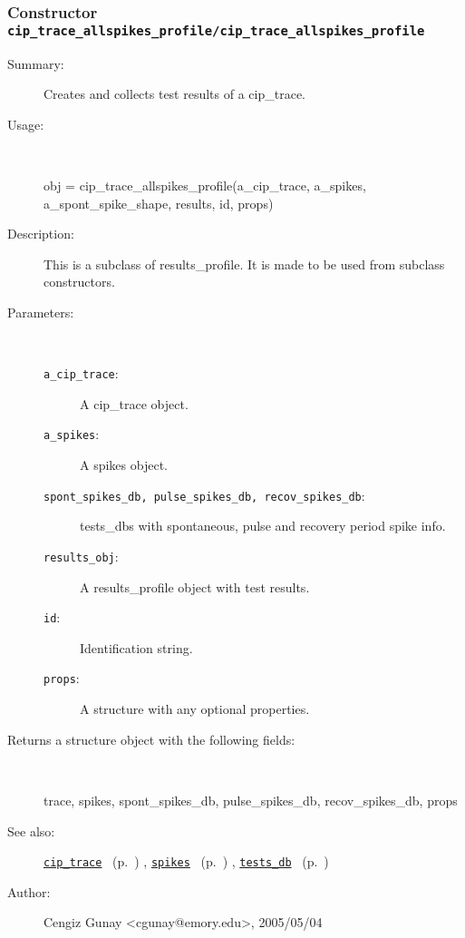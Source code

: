 \subsubsection[Constructor \texttt{cip\_trace\_allspikes\_profile}]{Constructor \texttt{cip\_trace\_allspikes\_profile/cip\_trace\_allspikes\_profile}}%
%
\label{ref_cip_trace_allspikes_profile__cip_trace_allspikes_profile}%
\hypertarget{ref_cip_trace_allspikes_profile__cip_trace_allspikes_profile}{}%
\begin{description}
\item[Summary:]Creates and collects test results of a cip\_trace.
%
\item[Usage:]~%
\begin{lyxcode}%
obj = 
   cip\_trace\_allspikes\_profile(a\_cip\_trace, a\_spikes, a\_spont\_spike\_shape, 
				results, id, props)
%
\end{lyxcode}%
%
\item[Description:]%
This is a subclass of results\_profile. It is made to be used from 
 subclass constructors.
\item[Parameters:]~
\begin{description}%
\item[\texttt{a\_cip\_trace}:]
 A cip\_trace object.
\item[\texttt{a\_spikes}:]
 A spikes object.
\item[\texttt{spont\_spikes\_db, pulse\_spikes\_db, recov\_spikes\_db}:]
 

tests\_dbs with spontaneous, pulse and recovery period spike info.
\item[\texttt{results\_obj}:]
 A results\_profile object with test results.
\item[\texttt{id}:]
 Identification string.
\item[\texttt{props}:]
 A structure with any optional properties.
\end{description}%
%
\item[Returns a structure object with the following fields:
]~

	trace, spikes, spont\_spikes\_db, 
	pulse\_spikes\_db, recov\_spikes\_db, props
%
%
\item[See also:]%
\hyperlink{ref_cip_trace}{\texttt{cip\_trace}}%
\ (p.~\pageref{ref_cip_trace})%
%
, \hyperlink{ref_spikes}{\texttt{spikes}}%
\ (p.~\pageref{ref_spikes})%
%
, \hyperlink{ref_tests_db}{\texttt{tests\_db}}%
\ (p.~\pageref{ref_tests_db})%
%
%
\item[Author:]%
Cengiz Gunay <cgunay@emory.edu>, 2005/05/04
%
\end{description}
\methodline%
